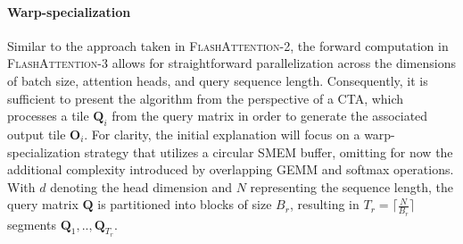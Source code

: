 \begin{enumerate}
\paragraph{Warp-specialization}
Similar to the approach taken in \textsc{FlashAttention-2}, the forward computation in \textsc{FlashAttention-3} allows for straightforward parallelization across the dimensions of batch size, attention heads, and query sequence length. Consequently, it is sufficient to present the algorithm from the perspective of a CTA, which processes a tile $\mathbf{Q}_i$ from the query matrix in order to generate the associated output tile $\mathbf{O}_i$. For clarity, the initial explanation will focus on a warp-specialization strategy that utilizes a circular SMEM buffer, omitting for now the additional complexity introduced by overlapping GEMM and softmax operations. With $d$ denoting the head dimension and $N$ representing the sequence length, the query matrix $\mathbf{Q}$ is partitioned into blocks of size $B_r$, resulting in $T_r = \lceil \frac{N}{B_r} \rceil$ segments $\mathbf{Q}_1, .., \mathbf{Q}_{T_r}$.


\end{enumerate}
